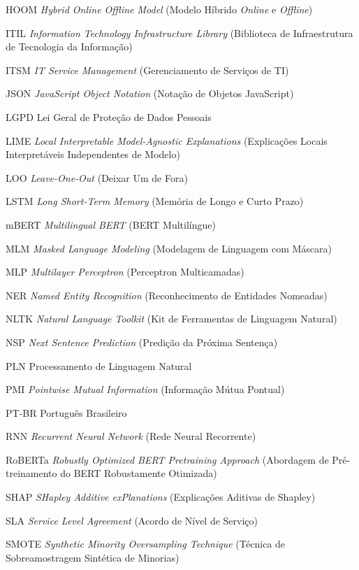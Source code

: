 \documentclass[
    12pt,                %
    openright,           %
    oneside,             %
    a4paper,             %
    english,             %
    brazil               %
]{abntex2}
\begin{document}
\begin{siglas}
  \item[HOOM] \textit{Hybrid Online Offline Model} (Modelo Híbrido \textit{Online} e \textit{Offline})
  \item[ITIL] \textit{Information Technology Infrastructure Library} (Biblioteca de Infraestrutura de Tecnologia da Informação)
  \item[ITSM] \textit{IT Service Management} (Gerenciamento de Serviços de TI)
  \item[JSON] \textit{JavaScript Object Notation} (Notação de Objetos JavaScript)
  \item[LGPD] Lei Geral de Proteção de Dados Pessoais
  \item[LIME] \textit{Local Interpretable Model-Agnostic Explanations} (Explicações Locais Interpretáveis Independentes de Modelo)
  \item[LOO] \textit{Leave-One-Out} (Deixar Um de Fora)
  \item[LSTM] \textit{Long Short-Term Memory} (Memória de Longo e Curto Prazo)
  \item[mBERT] \textit{Multilingual BERT} (BERT Multilíngue)
  \item[MLM] \textit{Masked Language Modeling} (Modelagem de Linguagem com Máscara)
  \item[MLP] \textit{Multilayer Perceptron} (Perceptron Multicamadas)
  \item[NER] \textit{Named Entity Recognition} (Reconhecimento de Entidades Nomeadas)
  \item[NLTK] \textit{Natural Language Toolkit} (Kit de Ferramentas de Linguagem Natural)
  \item[NSP] \textit{Next Sentence Prediction} (Predição da Próxima Sentença)
  \item[PLN] Processamento de Linguagem Natural
  \item[PMI] \textit{Pointwise Mutual Information} (Informação Mútua Pontual)
  \item[PT-BR] Português Brasileiro
  \item[RNN] \textit{Recurrent Neural Network} (Rede Neural Recorrente)
  \item[RoBERTa] \textit{Robustly Optimized BERT Pretraining Approach} (Abordagem de Pré-treinamento do BERT Robustamente Otimizada)
  \item[SHAP] \textit{SHapley Additive exPlanations} (Explicações Aditivas de Shapley)
  \item[SLA] \textit{Service Level Agreement} (Acordo de Nível de Serviço)
  \item[SMOTE] \textit{Synthetic Minority Oversampling Technique} (Técnica de Sobreamostragem Sintética de Minorias)

\end{siglas}
\end{document}
